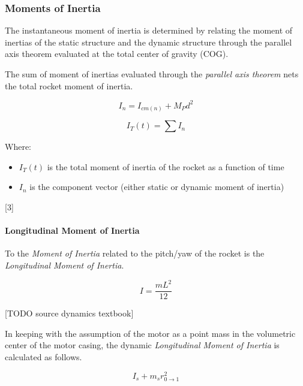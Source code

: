 \documentclass[]{article}
\providecommand{\tightlist}{%
  \setlength{\itemsep}{0pt}\setlength{\parskip}{0pt}}
\let\oldparagraph\paragraph
\renewcommand{\paragraph}[1]{\oldparagraph{#1}\mbox{}}
\begin{document}
\subsubsection{Moments of Inertia}\label{moments-of-inertia}

The instantaneous moment of inertia is determined by relating the moment
of inertias of the static structure and the dynamic structure through
the parallel axis theorem evaluated at the total center of gravity
(COG).

The sum of moment of inertias evaluated through the \emph{parallel axis
theorem} nets the total rocket moment of inertia.

\begin{equation}
\label{eq_parallel_axis_theorem}
I_n = I_{cm(n)} + M_P d^2 
\end{equation}

\begin{equation}
I_T(t) = \sum I_n 
\end{equation}

Where:

\begin{itemize}
\tightlist
\item
  \(I_T(t)\) is the total moment of inertia of the rocket as a function
  of time
\item
  \(I_n\) is the component vector (either static or dynamic moment of
  inertia)
\end{itemize}

{[}3{]}

\paragraph{Longitudinal Moment of
Inertia}\label{longitudinal-moment-of-inertia}

To the \emph{Moment of Inertia} related to the pitch/yaw of the rocket
is the \emph{Longitudinal Moment of Inertia}.

\begin{equation}
\label{longitudinal_moment_inertia}
I = \dfrac{mL^2}{12}
\end{equation}

{[}TODO source dynamics textbook{]}

In keeping with the assumption of the motor as a point mass in the
volumetric center of the motor casing, the dynamic \emph{Longitudinal
Moment of Inertia} is calculated as follows.

\begin{equation}
\label{static_longitudinal_moment_inertia}
I_{s} + m_{s} r_{0 \rightarrow 1}^2
\end{equation}
\end{document}
